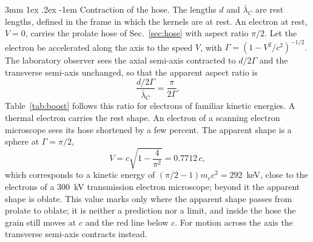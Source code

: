 \documentclass[%
 reprint, amsmath,amssymb, aps, prb, ]{revtex4-2}
\makeatletter
\numberwithin{equation}{section}
\renewcommand\paragraph{%
  \@startsection{paragraph}{4}{\z@}%
    {3mm \@plus 1ex \@minus .2ex}%
    {-1em}%
    {\normalfont\normalsize\itshape}}
\newcommand{\lbar}{\bar{\lambda}_C}
\makeatother
\begin{document}
\paragraph{Contraction of the hose.} The lengths $d$ and $\lbar$ are rest lengths, defined in the frame in which the kernels are at rest. An electron at rest, $V = 0$, carries the prolate hose of Sec.~\ref{sec:hose} with aspect ratio $\pi/2$. Let the electron be accelerated along the axis to the speed $V$, with $\Gamma = (1 - V^2/c^2)^{-1/2}$. The laboratory observer sees the axial semi-axis contracted to $d/2\Gamma$ and the transverse semi-axis unchanged, so that the apparent aspect ratio is
\begin{equation}
\frac{d/2\Gamma}{\lbar} = \frac{\pi}{2\Gamma} .
\label{eq:aspectV}
\end{equation}
Table~\ref{tab:boost} follows this ratio for electrons of familiar kinetic energies. A thermal electron carries the rest shape. An electron of a scanning electron microscope sees its hose shortened by a few percent. The apparent shape is a sphere at $\Gamma = \pi/2$,
\begin{equation}
V = c\sqrt{1 - \frac{4}{\pi^2}} = 0.7712\,c ,
\label{eq:sphere}
\end{equation}
which corresponds to a kinetic energy of $(\pi/2 - 1)m_ec^2 = 292$~keV, close to the electrons of a $300$~kV transmission electron microscope; beyond it the apparent shape is oblate. This value marks only where the apparent shape passes from prolate to oblate; it is neither a prediction nor a limit, and inside the hose the grain still moves at $c$ and the red line below $c$. For motion across the axis the transverse semi-axis contracts instead.
\end{document}
